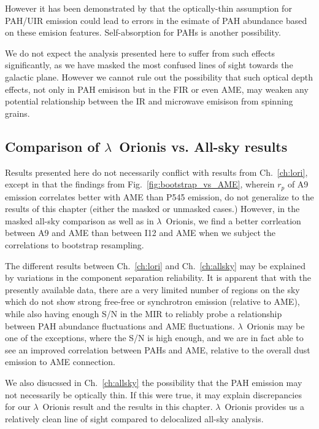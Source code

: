               However it has been demonstrated by \cite{sakon04} that the optically-thin assumption for PAH/UIR emission could lead to errors in the esimate of PAH abundance based on these emision features. Self-absorption for PAHs is another possibility.

              We do not expect the analysis presented here to suffer from such effects significantly, as we have masked the most confused lines of sight towards the galactic plane. However we cannot rule out the possibility that such optical depth effects, not only in PAH emisison but in the FIR or even AME, may weaken any potential relationship between the IR and microwave emisison from spinning grains.

            \subsection{Comparison of $\lambda$~Orionis vs. All-sky results}
              Results presented here do not necessarily conflict with results from Ch.~\ref{ch:lori}, except in that the findings from Fig.~\ref{fig:bootstrap_vs_AME}, wherein $r_{p}$ of A9 emission correlates better with AME than P545 emission, do not generalize to the results of this chapter (either the masked or unmasked cases.) However, in the masked all-sky comparison as well as in $\lambda$~Orionis, we find a better corrleation between A9 and AME than between I12 and AME when we subject the correlations to bootstrap resampling.

               The different results between Ch.~\ref{ch:lori} and Ch.~\ref{ch:allsky} may be explained by variations in the component separation reliability. It is apparent that with the presently available data, there are a very limited number of regions on the sky which do not show strong free-free or synchrotron emission (relative to AME), while also having enough S/N in the MIR to reliably probe a relationship between PAH abundance fluctuations and AME fluctuations. $\lambda$~Orionis may be one of the exceptions, where the S/N is high enough, and we are in fact able to see an improved correlation between PAHs and AME, relative to the overall dust emission to AME connection.

              We also disucssed in Ch.~\ref{ch:allsky} the possibility that the PAH emission may not necessarily be optically thin. If this were true, it may explain discrepancies for our $\lambda$~Orionis result and the results in this chapter. $\lambda$~Orionis provides us a relatively clean line of sight compared to delocalized all-sky analysis.

